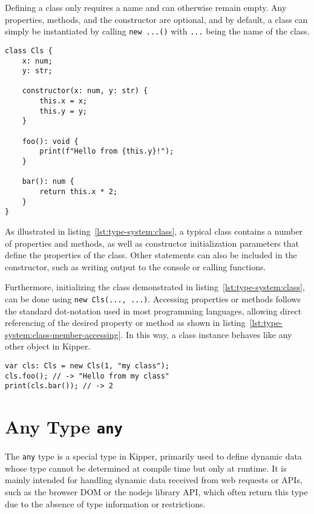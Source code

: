 Defining a class only requires a name and can otherwise remain empty. Any properties, methods, and the constructor are optional, and by default, a class can simply be instantiated by calling \lstinline|new ...()| with \lstinline|...| being the name of the class. 

\begin{lstlisting}[language=Kipper,caption=The definition of a simple class with a constructor\, methods and properties,label=lst:type-system:class]
class Cls {
	x: num;
	y: str;
	
	constructor(x: num, y: str) {
		this.x = x;
		this.y = y;
	}
	
	foo(): void {
		print(f"Hello from {this.y}!");
	}
	
	bar(): num {
		return this.x * 2;
	}
}
\end{lstlisting}

As illustrated in listing~\ref{lst:type-system:class}, a typical class contains a number of properties and methods, as well as constructor initialization parameters that define the properties of the class. Other statements can also be included in the constructor, such as writing output to the console or calling functions.

Furthermore, initializing the class demonstrated in listing~\ref{lst:type-system:class}, can be done using \lstinline|new Cls(..., ...)|. Accessing properties or methods follows the standard dot-notation used in most programming languages, allowing direct referencing of the desired property or method as shown in listing~\ref{lst:type-system:class-member-accessing}. In this way, a class instance behaves like any other object in Kipper.

\begin{lstlisting}[language=Kipper,caption=Accessing the members of a Kipper class,label=lst:type-system:class-member-accessing]
var cls: Cls = new Cls(1, "my class");
cls.foo(); // -> "Hello from my class"
print(cls.bar()); // -> 2
\end{lstlisting}

\section{Any Type \lstinline|any|}
\label{sec:kipper-any}

The \lstinline|any| type is a special type in Kipper, primarily used to define dynamic data whose type cannot be determined at compile time but only at runtime. It is mainly intended for handling dynamic data received from web requests or APIs, such as the browser DOM or the \Gls{nodejs} library API, which often return this type due to the absence of type information or restrictions.

